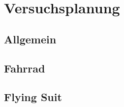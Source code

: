 \chapter{Versuchsplanung}
\label{cha:versuchsplanung}

\section{Allgemein}

\section{Fahrrad}

\section{Flying Suit}

\todo{}